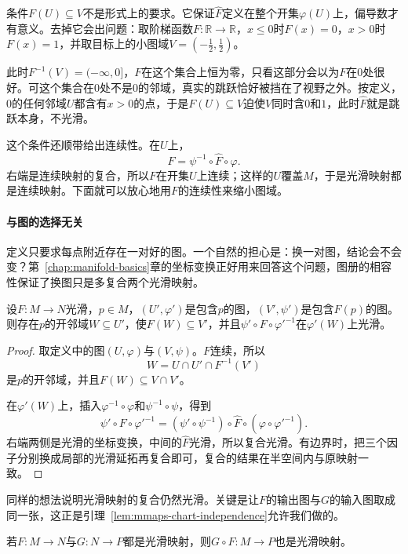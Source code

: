 条件$F(U)\subseteq V$不是形式上的要求。它保证$\hat F$定义在整个开集$\varphi(U)$上，偏导数才有意义。去掉它会出问题：取阶梯函数$F:\mathbb R\to\mathbb R$，$x\leq0$时$F(x)=0$，$x>0$时$F(x)=1$，并取目标上的小图域$V=(-\tfrac12,\tfrac12)$。

此时$F^{-1}(V)=(-\infty,0]$，$F$在这个集合上恒为零，只看这部分会以为$F$在$0$处很好。可这个集合在$0$处不是$0$的邻域，真实的跳跃恰好被挡在了视野之外。按定义，$0$的任何邻域$U$都含有$x>0$的点，于是$F(U)\subseteq V$迫使$V$同时含$0$和$1$，此时$\hat F$就是跳跃本身，不光滑。

这个条件还顺带给出连续性。在$U$上，
\[
F=\psi^{-1}\circ\hat F\circ\varphi .
\]
右端是连续映射的复合，所以$F$在开集$U$上连续；这样的$U$覆盖$M$，于是光滑映射都是连续映射。下面就可以放心地用$F$的连续性来缩小图域。

\paragraph{与图的选择无关}
定义只要求每点附近存在一对好的图。一个自然的担心是：换一对图，结论会不会变？第~\ref{chap:manifold-basics}章的坐标变换正好用来回答这个问题，图册的相容性保证了换图只是多复合两个光滑映射。

\begin{lemma}[换图不改变光滑性]
\label{lem:mmaps-chart-independence}
设$F:M\to N$光滑，$p\in M$，$(U',\varphi')$是包含$p$的图，$(V',\psi')$是包含$F(p)$的图。则存在$p$的开邻域$W\subseteq U'$，使$F(W)\subseteq V'$，并且$\psi'\circ F\circ\varphi'^{-1}$在$\varphi'(W)$上光滑。
\end{lemma}

\begin{proof}
取定义中的图$(U,\varphi)$与$(V,\psi)$。$F$连续，所以
\[
W=U\cap U'\cap F^{-1}(V')
\]
是$p$的开邻域，并且$F(W)\subseteq V\cap V'$。

在$\varphi'(W)$上，插入$\varphi^{-1}\circ\varphi$和$\psi^{-1}\circ\psi$，得到
\[
\psi'\circ F\circ\varphi'^{-1}
=(\psi'\circ\psi^{-1})\circ\hat F\circ(\varphi\circ\varphi'^{-1}).
\]
右端两侧是光滑的坐标变换，中间的$\hat F$光滑，所以复合光滑。有边界时，把三个因子分别换成局部的光滑延拓再复合即可，复合的结果在半空间内与原映射一致。
\end{proof}

同样的想法说明光滑映射的复合仍然光滑。关键是让$F$的输出图与$G$的输入图取成同一张，这正是引理~\ref{lem:mmaps-chart-independence}允许我们做的。

\begin{theorem}[复合的光滑性]
\label{thm:mmaps-composition}
若$F:M\to N$与$G:N\to P$都是光滑映射，则$G\circ F:M\to P$也是光滑映射。
\end{theorem}

